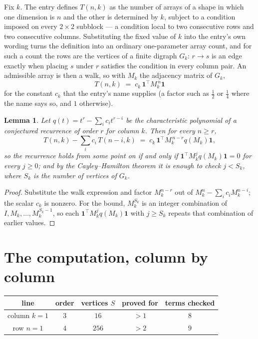 \documentclass[11pt,a4paper]{article}
\theoremstyle{plain}
\newtheorem{lemma}[theorem]{Lemma}
\theoremstyle{definition}
\begin{document}
Fix $k$. The entry defines $T(n,k)$ as the number of arrays of a shape in which one dimension
is $n$ and the other is determined by $k$, subject to a condition imposed on every
$2\times2$ subblock --- a condition local to two consecutive rows and two consecutive columns.
Substituting the fixed value of $k$ into the entry's own wording turns the definition into an
ordinary one-parameter array count, and for such a count the rows are the vertices of a finite
digraph $G_k$: $r\to s$ is an edge exactly when placing $s$ under $r$ satisfies the condition
in every column pair. An admissible array is then a walk, so with $M_k$ the adjacency matrix
of $G_k$,
\[
T(n,k)\;=\;c_k\,\mathbf{1}^{\!\top}M_k^{\,n}\mathbf{1}
\]
for the constant $c_k$ that the entry's name supplies (a factor such as $\tfrac12$ or
$\tfrac14$ where the name says so, and $1$ otherwise).

\begin{lemma}\label{lem:crit}
Let $q(t)=t^{r}-\sum_i c_it^{r-i}$ be the characteristic polynomial of a conjectured
recurrence of order $r$ for column $k$. Then for every $n\ge r$,
\[
T(n,k)-\sum_i c_i\,T(n-i,k)\;=\;c_k\,\mathbf{1}^{\!\top}M_k^{\,n-r}q(M_k)\mathbf{1},
\]
so the recurrence holds from some point on if and only if
$\mathbf{1}^{\!\top}M_k^{j}q(M_k)\mathbf{1}=0$ for every $j\ge0$; and by the
Cayley--Hamilton theorem it is enough to check $j<S_k$, where $S_k$ is the number of vertices
of $G_k$.
\end{lemma}

\begin{proof}
Substitute the walk expression and factor $M_k^{n-r}$ out of $M_k^{n}-\sum_ic_iM_k^{n-i}$;
the scalar $c_k$ is nonzero. For the bound, $M_k^{S_k}$ is an integer combination of
$I,M_k,\dots,M_k^{S_k-1}$, so each $\mathbf{1}^{\!\top}M_k^{j}q(M_k)\mathbf{1}$ with
$j\ge S_k$ repeats that combination of earlier values.
\end{proof}

\section{The computation, column by column}

\begin{center}
\begin{tabular}{ccccc}
line & order & vertices $S$ & proved for & terms checked \\ \hline
column $k$$=1$ & $3$ & $16$ & $>1$ & $8$ \\
row $n$$=1$ & $4$ & $256$ & $>2$ & $9$ \\
\end{tabular}
\end{center}
\end{document}
